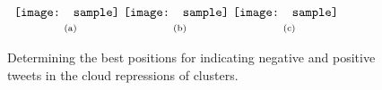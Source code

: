 \begin{figure*}[t]
\begin{center}
$\begin{array}{c@{\hspace{0.01\linewidth}}c@{\hspace{0.01\linewidth}}c}
\texttt{[image: sample]} &
\texttt{[image: sample]} &
\texttt{[image: sample]}
\\
\mbox{\small{(a)}} & \mbox{\small{(b)}} & \mbox{\small{(c)}}
\end{array}$
\end{center}
\vspace{-.1in}
\caption{Determining the best positions for indicating negative and positive tweets in the cloud repressions of clusters.}
\label{fig:corners}
\end{figure*}

